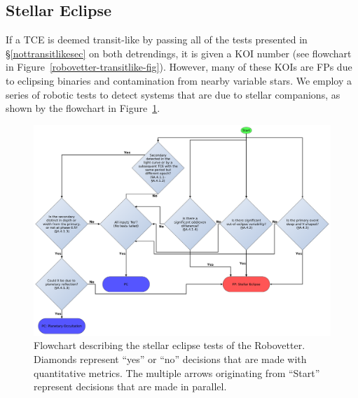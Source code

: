 \subsection{Stellar Eclipse}
\label{sigsecsec}

If a TCE is deemed transit-like by passing all of the tests presented in \S\ref{nottransitlikesec} on both detrendings, it is given a KOI number (see flowchart in Figure~\ref{robovetter-transitlike-fig}).
However, many of these KOIs are FPs due to eclipsing binaries and contamination from nearby variable stars. We employ a series of robotic tests to detect systems that are due to stellar companions, as shown by the flowchart in Figure~\ref{robovetter-sigsec-fig}.







\begin{figure}[ht]
\centering
\includegraphics[width=\linewidth]{RoboVetter-Diagram-V4-SigSec.pdf}
\caption{Flowchart describing the stellar eclipse tests of the Robovetter. Diamonds represent ``yes'' or ``no'' decisions that are made with quantitative metrics. The multiple arrows originating from ``Start'' represent decisions that are made in parallel.}
\label{robovetter-sigsec-fig}
\end{figure}


